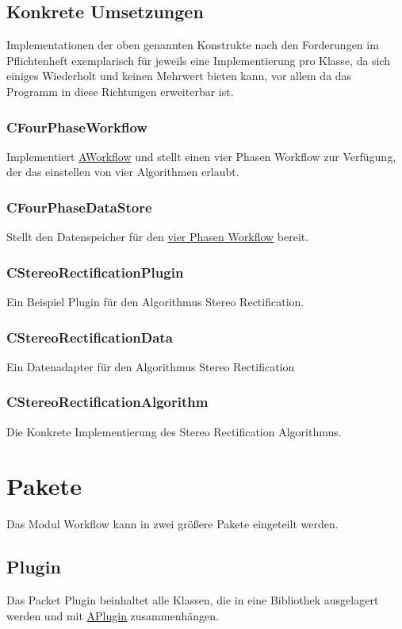 \subsection{Konkrete Umsetzungen}
Implementationen der oben genannten Konstrukte nach den Forderungen im Pflichtenheft exemplarisch für jeweils eine Implementierung pro Klasse, da sich einiges Wiederholt und keinen Mehrwert bieten kann, vor allem da das Programm in diese Richtungen erweiterbar ist.
\subsubsection{CFourPhaseWorkflow} \label{Workflow:CFourPhaseWorkflow}
Implementiert \hyperref[Workflow:AWorkflow]{AWorkflow} und stellt einen vier Phasen Workflow zur Verfügung, der das einstellen von vier Algorithmen erlaubt.
\subsubsection{CFourPhaseDataStore}
Stellt den Datenspeicher für den \hyperref[Workflow:CFourPhaseWorkflow]{vier Phasen Workflow} bereit.
\subsubsection{CStereoRectificationPlugin}
Ein Beispiel Plugin für den Algorithmus Stereo Rectification.
\subsubsection{CStereoRectificationData}
Ein Datenadapter für den Algorithmus Stereo Rectification
\subsubsection{CStereoRectificationAlgorithm}
Die Konkrete Implementierung des Stereo Rectification Algorithmus.

\section{Pakete}
Das Modul Workflow kann in zwei größere Pakete eingeteilt werden.
\subsection{Plugin}
Das Packet Plugin beinhaltet alle Klassen, die in eine Bibliothek ausgelagert werden und mit \hyperref[Workflow:APlugin]{APlugin} zusammenhängen.
